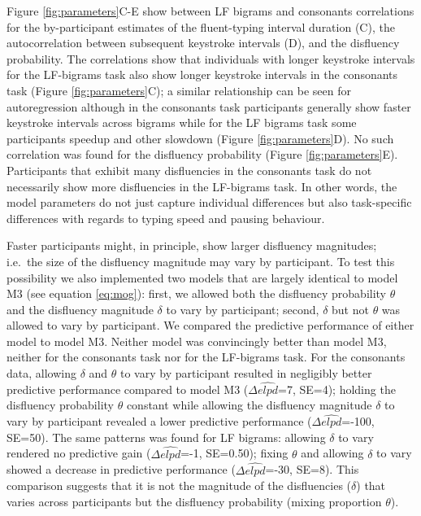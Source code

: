 \documentclass[
  english,
  man,mask,floatsintext]{apa7}
\begin{document}
Figure \ref{fig:parameters}C-E show between LF bigrams and consonants correlations for the by-participant estimates of the fluent-typing interval duration (C), the autocorrelation between subsequent keystroke intervals (D), and the disfluency probability. The correlations show that individuals with longer keystroke intervals for the LF-bigrams task also show longer keystroke intervals in the consonants task (Figure \ref{fig:parameters}C); a similar relationship can be seen for autoregression although in the consonants task participants generally show faster keystroke intervals across bigrams while for the LF bigrams task some participants speedup and other slowdown (Figure \ref{fig:parameters}D). No such correlation was found for the disfluency probability (Figure \ref{fig:parameters}E). Participants that exhibit many disfluencies in the consonants task do not necessarily show more disfluencies in the LF-bigrams task. In other words, the model parameters do not just capture individual differences but also task-specific differences with regards to typing speed and pausing behaviour.

Faster participants might, in principle, show larger disfluency magnitudes; i.e.~the size of the disfluency magnitude may vary by participant. To test this possibility we also implemented two models that are largely identical to model M3 (see equation \ref{eq:mog}): first, we allowed both the disfluency probability \(\theta\) and the disfluency magnitude \(\delta\) to vary by participant; second, \(\delta\) but not \(\theta\) was allowed to vary by participant. We compared the predictive performance of either model to model M3. Neither model was convincingly better than model M3, neither for the consonants task nor for the LF-bigrams task. For the consonants data, allowing \(\delta\) and \(\theta\) to vary by participant resulted in negligibly better predictive performance compared to model M3 (\(\Delta\widehat{elpd}\)=7, SE=4); holding the disfluency probability \(\theta\) constant while allowing the disfluency magnitude \(\delta\) to vary by participant revealed a lower predictive performance (\(\Delta\widehat{elpd}\)=-100, SE=50). The same patterns was found for LF bigrams: allowing \(\delta\) to vary rendered no predictive gain (\(\Delta\widehat{elpd}\)=-1, SE=0.50); fixing \(\theta\) and allowing \(\delta\) to vary showed a decrease in predictive performance (\(\Delta\widehat{elpd}\)=-30, SE=8). This comparison suggests that it is not the magnitude of the disfluencies (\(\delta\)) that varies across participants but the disfluency probability (mixing proportion \(\theta\)).
\end{document}

